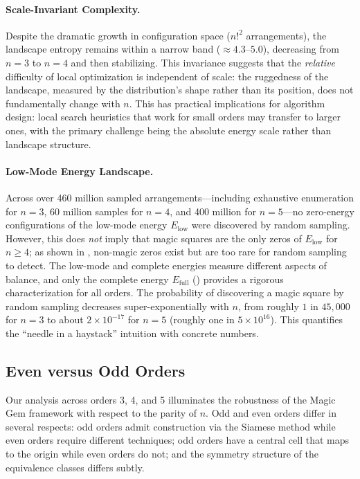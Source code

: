 \paragraph{Scale-Invariant Complexity.}
Despite the dramatic growth in configuration space ($n!^2$ arrangements),
the landscape entropy remains within a narrow band ($\approx 4.3$--$5.0$),
decreasing from $n=3$ to $n=4$ and then stabilizing.
This invariance suggests that the \emph{relative} difficulty of local optimization 
is independent of scale: the ruggedness of the landscape, 
measured by the distribution's shape rather than its position,
does not fundamentally change with $n$.
This has practical implications for algorithm design:
local search heuristics that work for small orders may transfer to larger ones,
with the primary challenge being the absolute energy scale rather than landscape structure.

\paragraph{Low-Mode Energy Landscape.}
Across over 460 million sampled arrangements---including exhaustive enumeration for $n=3$,
60 million samples for $n=4$, and 400 million for $n=5$---no zero-energy 
configurations of the low-mode energy $E_{\mathrm{low}}$ were discovered by random sampling.
However, this does \emph{not} imply that magic squares are the only zeros of $E_{\mathrm{low}}$ for $n \geq 4$;
as shown in , non-magic zeros exist but are too rare for random sampling to detect.
The low-mode and complete energies measure different aspects of balance,
and only the complete energy $E_{\mathrm{full}}$ () provides a rigorous characterization for all orders.
The probability of discovering a magic square by random sampling decreases super-exponentially 
with $n$, from roughly $1$ in $45{,}000$ for $n=3$ to about $2\times 10^{-17}$ for $n=5$
(roughly one in $5\times 10^{16}$).
This quantifies the ``needle in a haystack'' intuition with concrete numbers.

\subsection{Even versus Odd Orders}

Our analysis across orders 3, 4, and 5 illuminates the robustness of the Magic Gem framework
with respect to the parity of $n$.
Odd and even orders differ in several respects:
odd orders admit construction via the Siamese method while even orders require different techniques;
odd orders have a central cell that maps to the origin while even orders do not;
and the symmetry structure of the equivalence classes differs subtly.

